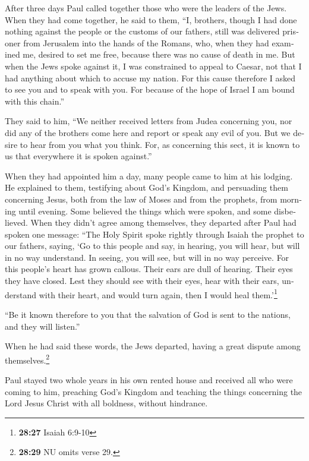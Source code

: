 \begin{paracol}{2}
\begin{otherlanguage}{english}
 After three days Paul called together those who were the
leaders of the Jews. When they had come together, he said to them, ``I,
brothers, though I had done nothing against the people or the customs of
our fathers, still was delivered prisoner from Jerusalem into the hands
of the Romans,  who, when they had examined me, desired
to set me free, because there was no cause of death in me.
 But when the Jews spoke against it, I was constrained to
appeal to Caesar, not that I had anything about which to accuse my
nation.  For this cause therefore I asked to see you and
to speak with you. For because of the hope of Israel I am bound with
this chain.''

 They said to him, ``We neither received letters from
Judea concerning you, nor did any of the brothers come here and report
or speak any evil of you.  But we desire to hear from you
what you think. For, as concerning this sect, it is known to us that
everywhere it is spoken against.''

 When they had appointed him a day, many people came to
him at his lodging. He explained to them, testifying about God's
Kingdom, and persuading them concerning Jesus, both from the law of
Moses and from the prophets, from morning until evening. 
Some believed the things which were spoken, and some disbelieved.
 When they didn't agree among themselves, they departed
after Paul had spoken one message: ``The Holy Spirit spoke rightly
through Isaiah the prophet to our fathers,  saying, `Go
to this people and say, in hearing, you will hear, but will in no way
understand. In seeing, you will see, but will in no way perceive.
 For this people's heart has grown callous. Their ears
are dull of hearing. Their eyes they have closed. Lest they should see
with their eyes, hear with their ears, understand with their heart, and
would turn again, then I would heal them.'\footnote{\textbf{28:27}
  Isaiah 6:9-10}

 ``Be it known therefore to you that the salvation of God
is sent to the nations, and they will listen.''

 When he had said these words, the Jews departed, having
a great dispute among themselves.\footnote{\textbf{28:29} NU omits verse
  29.}

 Paul stayed two whole years in his own rented house and
received all who were coming to him,  preaching God's
Kingdom and teaching the things concerning the Lord Jesus Christ with
all boldness, without hindrance. \end{otherlanguage}
\end{paracol}
